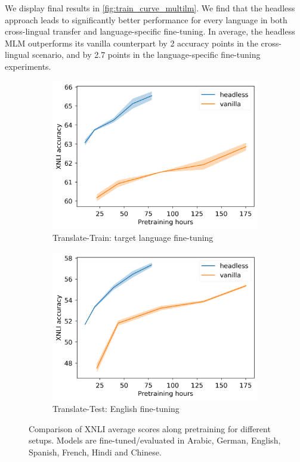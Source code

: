 We display final results in \autoref{fig:train_curve_multilm}. We find that the headless approach leads to significantly better performance for every language in both cross-lingual transfer and language-specific fine-tuning. In average, the headless MLM outperforms its vanilla counterpart by 2 accuracy points in the cross-lingual scenario, and by 2.7 points in the language-specific fine-tuning experiments.

\begin{figure}[h]
    \centering
    \begin{subfigure}[b]{0.42\columnwidth}
         \includegraphics[width=\linewidth]{sources/part_2/headless/imgs/xnli_translate_train_p13.png}
         \caption{Translate-Train: target language fine-tuning}
         \label{fig:translate_train}
    \end{subfigure}
    \begin{subfigure}[b]{0.42\columnwidth}
         \includegraphics[width=\linewidth]{sources/part_2/headless/imgs/xnli_cross_p13.png}
         \caption{Translate-Test: English fine-tuning}
         \label{fig:translate_test}
    \end{subfigure}
    \caption{Comparison of XNLI average scores along pretraining for different setups. Models are fine-tuned/evaluated in Arabic, German, English, Spanish, French, Hindi and Chinese. %
    }
    \label{fig:train_curve_multilm}
\end{figure}

